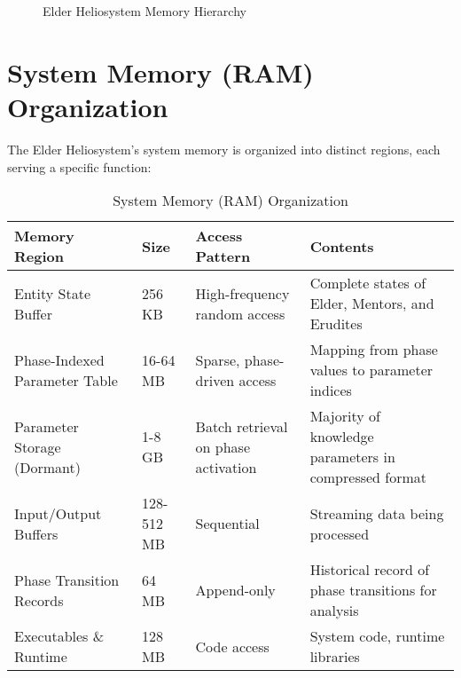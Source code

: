 \begin{figure}[h]
\centering
{}
\caption{Elder Heliosystem Memory Hierarchy}
\end{figure}

\section{System Memory (RAM) Organization}

The Elder Heliosystem's system memory is organized into distinct regions, each serving a specific function:

\begin{table}[h]
\centering
\small
\begin{tabular}{|p{3.5cm}|p{3cm}|p{3cm}|p{4cm}|}
\hline
\textbf{Memory Region} & \textbf{Size} & \textbf{Access Pattern} & \textbf{Contents} \\
\hline
Entity State Buffer & 256 KB & High-frequency random access & Complete states of Elder, Mentors, and Erudites \\
\hline
Phase-Indexed Parameter Table & 16-64 MB & Sparse, phase-driven access & Mapping from phase values to parameter indices \\
\hline
Parameter Storage (Dormant) & 1-8 GB & Batch retrieval on phase activation & Majority of knowledge parameters in compressed format \\
\hline
Input/Output Buffers & 128-512 MB & Sequential & Streaming data being processed \\
\hline
Phase Transition Records & 64 MB & Append-only & Historical record of phase transitions for analysis \\
\hline
Executables \& Runtime & 128 MB & Code access & System code, runtime libraries \\
\hline
\end{tabular}
\caption{System Memory (RAM) Organization}
\end{table}

